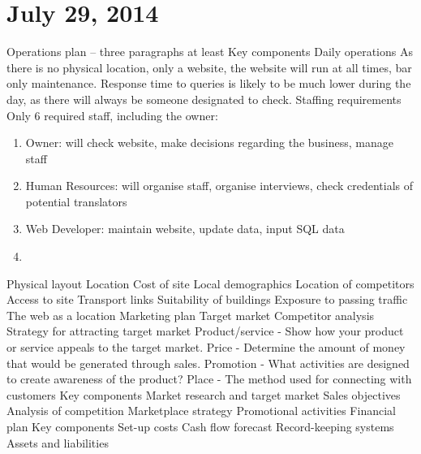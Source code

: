 \section{July 29, 2014}
\begin{outline}
\1 Operations plan -- three paragraphs at least
\2 Key components
\3 Daily operations
\4 As there is no physical location, only a website, the website will run at all times, bar only maintenance. Response time to queries is likely to be much lower during the day, as there will always be someone designated to check.
\3 Staffing requirements
\4 Only 6 required staff, including the owner:
\begin{enumerate}
\item Owner: will check website, make decisions regarding the business, manage staff
\item Human Resources: will organise staff, organise interviews, check credentials of potential translators
\item Web Developer: maintain website, update data, input SQL data
\item 
\end{enumerate}
\3 Physical layout
\3 Location
\3 Cost of site
\3 Local demographics
\3 Location of competitors
\3 Access to site
\3 Transport links
\3 Suitability of buildings
\3 Exposure to passing traffic
\3 The web as a location
\1 Marketing plan
\2 Target market
\2 Competitor analysis
\2 Strategy for attracting target market
\3 Product/service - Show how your product or service appeals to the target market.
\3 Price - Determine the amount of money that would be generated through sales.
\3 Promotion - What activities are designed to create awareness of the product?
\3 Place - The method used for connecting with customers
\2 Key components
\3 Market research and target market
\3 Sales objectives
\3 Analysis of competition
\3 Marketplace strategy
\3 Promotional activities
\1 Financial plan
\2 Key components
\3 Set-up costs
\3 Cash flow forecast
\3 Record-keeping systems
\3 Assets and liabilities
\end{outline}
